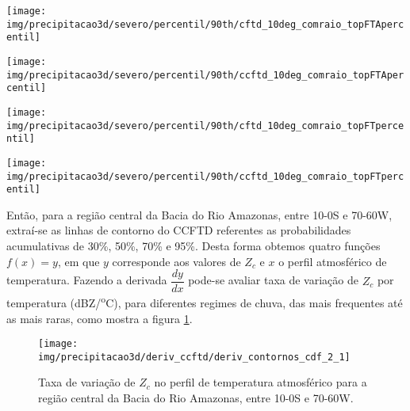 \begin{sidewaysfigure}%
\centering
\texttt{[image: img/precipitacao3d/severo/percentil/90th/cftd\_10deg\_comraio\_topFTApercentil]}
\caption{CFTDs para os extremos de FTA. Porção da precipitação com raios.}
\label{cftd_fta_com}
\end{sidewaysfigure} 

\begin{sidewaysfigure}%
\centering
\texttt{[image: img/precipitacao3d/severo/percentil/90th/ccftd\_10deg\_comraio\_topFTApercentil]}
\caption{CCFTDs para os extremos de FTA. Porção da precipitação com raios.}
\label{cftd_fta_com}
\end{sidewaysfigure} 

\begin{sidewaysfigure}%
\centering
\texttt{[image: img/precipitacao3d/severo/percentil/90th/cftd\_10deg\_comraio\_topFTpercentil]}
\caption{CFTDs para os extremos de FT. Porção da precipitação com raios.}
\label{cftd_ft_com}
\end{sidewaysfigure} 

\begin{sidewaysfigure}%
\centering
\texttt{[image: img/precipitacao3d/severo/percentil/90th/ccftd\_10deg\_comraio\_topFTpercentil]}
\caption{CCFTDs para os extremos de FT. Porção da precipitação com raios.}
\label{ccftd_ft_com}
\end{sidewaysfigure} 

Então, para a região central da Bacia do Rio Amazonas, entre 10-0S e 70-60W, extraí-se as linhas de contorno do CCFTD referentes as probabilidades acumulativas de 30\%, 50\%, 70\% e 95\%. Desta forma obtemos quatro funções $f(x)=y$,  em que $y$ corresponde aos valores de $Z_c$ e $x$ o perfil atmosférico de temperatura. Fazendo a derivada $\dfrac{dy}{dx}$ pode-se avaliar taxa de variação de $Z_c$ por temperatura (dBZ/\textsuperscript{o}C), para diferentes regimes de chuva, das mais frequentes até as mais raras, como mostra a figura \ref{deriv_amazonas}.

\begin{figure}[!ht]
  \centering
  \texttt{[image: img/precipitacao3d/deriv\_ccftd/deriv\_contornos\_cdf\_2\_1]}
  \caption{Taxa de variação de $Z_c$ no perfil de temperatura atmosférico para a região central da Bacia do Rio Amazonas, entre 10-0S e 70-60W.}
  \label{deriv_amazonas}  
\end{figure} 

